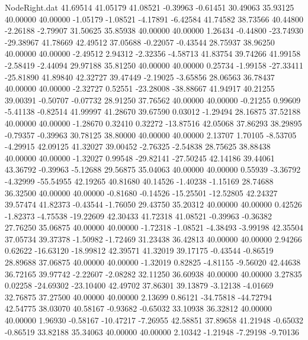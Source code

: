 \begin{filecontents}{NodeRight.dat}
  41.69514   41.05179   41.08521    -0.39963   -0.61451   30.49063   35.93125   40.00000   40.00000   -1.05179   -1.08521   -4.17891   -6.42584
  41.74582   38.73566   40.44800    -2.26188   -2.79907   31.50625   35.85938   40.00000   40.00000    1.26434   -0.44800  -23.74930  -29.38967
  41.78669   42.49512   37.05688    -0.22057   -0.43544   28.75937   38.96250   40.00000   40.00000   -2.49512    2.94312   -2.32356   -4.58713
  41.83754   39.74266   41.99158    -2.58419   -2.44094   29.97188   35.81250   40.00000   40.00000    0.25734   -1.99158  -27.33411  -25.81890
  41.89840   42.32727   39.47449    -2.19025   -3.65856   28.06563   36.78437   40.00000   40.00000   -2.32727    0.52551  -23.28008  -38.88667
  41.94917   40.21255   39.00391    -0.50707   -0.07732   28.91250   37.76562   40.00000   40.00000   -0.21255    0.99609   -5.41138   -0.82514
  41.99997   41.28670   39.67590     0.03012   -1.29494   28.16875   37.52188   40.00000   40.00000   -1.28670    0.32410    0.32272  -13.87516
  42.05068   37.86293   38.29895    -0.79357   -0.39963   30.78125   38.80000   40.00000   40.00000    2.13707    1.70105   -8.53705   -4.29915
  42.09125   41.32027   39.00452    -2.76325   -2.54838   28.75625   38.88438   40.00000   40.00000   -1.32027    0.99548  -29.82141  -27.50245
  42.14186   39.44061   43.36792    -0.39963   -5.12688   29.56875   35.04063   40.00000   40.00000    0.55939   -3.36792   -4.32999  -55.54955
  42.19265   40.81680   40.14526    -1.40238   -1.15169   28.74688   36.32500   40.00000   40.00000   -0.81680   -0.14526  -15.25501  -12.52805
  42.24327   39.57474   41.82373    -0.43544   -1.76050   29.43750   35.20312   40.00000   40.00000    0.42526   -1.82373   -4.75538  -19.22609
  42.30433   41.72318   41.08521    -0.39963   -0.36382   27.76250   35.06875   40.00000   40.00000   -1.72318   -1.08521   -4.38493   -3.99198
  42.35504   37.05734   39.37378    -1.50982   -1.72469   31.23438   36.42813   40.00000   40.00000    2.94266    0.62622  -16.63120  -18.99812
  42.39571   41.32019   39.17175    -0.43544   -0.86519   28.89688   37.06875   40.00000   40.00000   -1.32019    0.82825   -4.81155   -9.56020
  42.44638   36.72165   39.97742    -2.22607   -2.08282   32.11250   36.60938   40.00000   40.00000    3.27835    0.02258  -24.69302  -23.10400
  42.49702   37.86301   39.13879    -3.12138   -4.01669   32.76875   37.27500   40.00000   40.00000    2.13699    0.86121  -34.75818  -44.72794
  42.54775   38.03070   40.58167    -0.93682   -0.65032   33.10938   36.32812   40.00000   40.00000    1.96930   -0.58167  -10.47217   -7.26955
  42.58851   37.89658   41.21948    -0.65032   -0.86519   33.82188   35.34063   40.00000   40.00000    2.10342   -1.21948   -7.29198   -9.70136

\end{filecontents}

